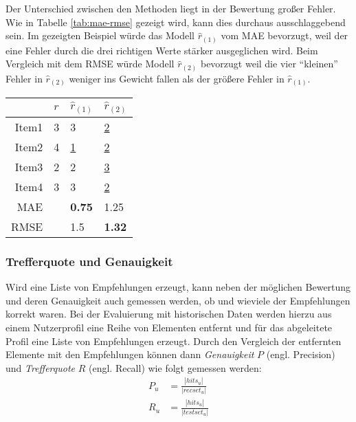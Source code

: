 Der Unterschied zwischen den Methoden liegt in der Bewertung großer Fehler. Wie in Tabelle \ref{tab:mae-rmse} gezeigt wird, kann dies durchaus ausschlaggebend sein. Im gezeigten Beispiel würde das Modell $\hat{r}_{(1)}$ vom \acs{MAE} bevorzugt, weil der eine Fehler durch die drei richtigen Werte stärker ausgeglichen wird. Beim Vergleich mit dem \acs{RMSE} würde Modell $\hat{r}_{(2)}$ bevorzugt weil die vier ``kleinen'' Fehler in $\hat{r}_{(2)}$ weniger ins Gewicht fallen als der größere Fehler in $\hat{r}_{(1)}$. \citep{hb_08}
\begin{SCtable}
  \centering
  \begin{tabular}{ | r | p{1cm} | p{1cm} | p{1cm} | }
    \hline
    & $r$ & $\hat{r}_{(1)}$ & $\hat{r}_{(2)}$ \\ \hline
    Item1 & 3 & 3 & \underline{2} \\
    Item2 & 4 & \underline{1} & \underline{2} \\
    Item3 & 2 & 2 & \underline{3} \\
    Item4 & 3 & 3 & \underline{2} \\ \hline \hline
    MAE & & \textbf{0.75} & 1.25 \\
    RMSE & & 1.5 & \textbf{1.32} \\
    \hline
  \end{tabular}
  \caption[Beispielrechnung zum Vergleich von \acs{MAE} und \acs{RMSE}]{\footnotesize Beispielrechnung zum Vergleich von \acs{MAE} und \acs{RMSE} - gegenübergestellt sind tatsächliche Bewertungen $r$ und von zwei verschiedenen Quellen erzeugte angenommene Bewertungen $\hat{r}_{(1)}$ und $\hat{r}_{(2)}$. Abweichende Bewertungen sind unterstrichen. }
  \label{tab:mae-rmse}
\end{SCtable}

\subsubsection{Trefferquote und Genauigkeit}

Wird eine Liste von Empfehlungen erzeugt, kann neben der möglichen Bewertung und deren Genauigkeit auch gemessen werden, ob und wieviele der Empfehlungen korrekt waren. Bei der Evaluierung mit historischen Daten werden hierzu aus einem Nutzerprofil eine Reihe von Elementen entfernt und für das abgeleitete Profil eine Liste von Empfehlungen erzeugt. Durch den Vergleich der entfernten Elemente mit den Empfehlungen können dann \textit{Genauigkeit} $P$ (engl. Precision) und \textit{Trefferquote} $R$ (engl. Recall) wie folgt gemessen werden:
\begin{align}
P_u & = \frac{|hits_u|}{| recset_u | } \label{form:precision} \\
R_u & = \frac{|hits_u|}{ | testset_u | } \label{form:recall}
\end{align}

